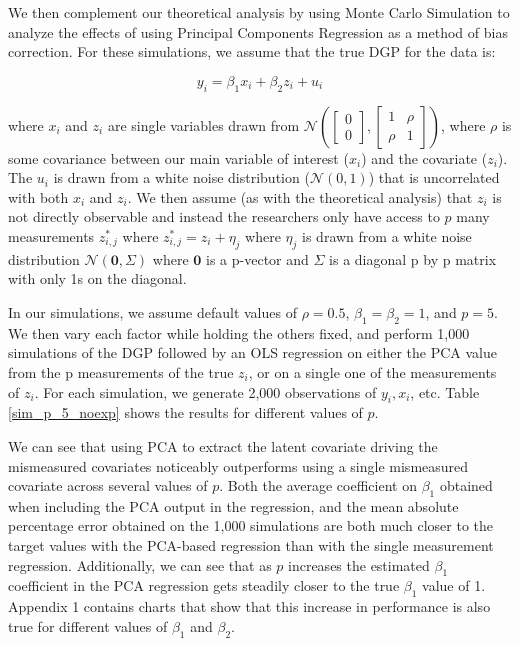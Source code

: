 \documentclass[10pt]{article}
\begin{document}
We then complement our theoretical analysis by using Monte Carlo Simulation to analyze the effects of using Principal Components Regression as a method of bias correction. For these simulations, we assume that the true DGP for the data is:

$$y_i = \beta_1 x_i + \beta_2 z_i + u_i$$

where $x_i$ and $z_i$ are single variables drawn from $\mathcal{N}(\begin{bmatrix} 0\\ 0 \end{bmatrix}, \begin{bmatrix} 1 & \rho\\ \rho & 1\end{bmatrix})$, where $\rho$ is some covariance between our main variable of interest ($x_i$) and the covariate ($z_i$). The $u_i$ is drawn from a white noise distribution ($\mathcal{N}(0,1)$) that is uncorrelated with both $x_i$ and $z_i$. We then assume (as with the theoretical analysis) that $z_i$ is not directly observable and instead the researchers only have access to $p$ many measurements $z_{i,j}^*$ where $z_{i,j}^* = z_i + \eta_j$ where $\eta_j$ is drawn from a white noise distribution $\mathcal{N}(\mathbf{0},\Sigma)$ where $\mathbf{0}$ is a p-vector and $\Sigma$ is a diagonal p by p matrix with only 1s on the diagonal.

In our simulations, we assume default values of $\rho = 0.5$, $\beta_1 = \beta_2 = 1$, and $p=5$. We then vary each factor while holding the others fixed, and perform 1,000 simulations of the DGP followed by an OLS regression on either the PCA value from the p measurements of the true $z_i$, or on a single one of the measurements of $z_i$. For each simulation, we generate 2,000 observations of $y_i,x_i$, etc. Table \ref{sim_p_5_noexp} shows the results for different values of $p$.



We can see that using PCA to extract the latent covariate driving the mismeasured covariates noticeably outperforms using a single mismeasured covariate across several values of $p$. Both the average coefficient on $\beta_1$ obtained when including the PCA output in the regression, and the mean absolute percentage error obtained on the 1,000 simulations are both much closer to the target values with the PCA-based regression than with the single measurement regression. Additionally, we can see that as $p$ increases the estimated $\beta_1$ coefficient in the PCA regression gets steadily closer to the true $\beta_1$ value of 1. Appendix 1 contains charts that show that this increase in performance is also true for different values of $\beta_1$ and $\beta_2$.
\end{document}
